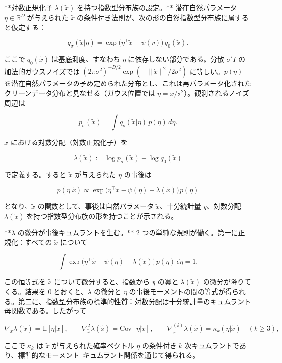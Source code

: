 **対数正規化子 $\lambda(\tilde{x})$ を持つ指数型分布族の設定。** 潜在自然パラメータ $\eta\in\mathbb{R}^D$ が与えられた $\tilde{x}$ の条件付き法則が、次の形の自然指数型分布族に属すると仮定する：

\[
q_\sigma(\tilde{x}|\eta)=\exp\bigl(\eta^\top\tilde{x}-\psi(\eta)\bigr)\,q_0(\tilde{x}).
\]


ここで $q_0(\tilde{x})$ は基底測度、すなわち $\eta$ に依存しない部分である。分散 $\sigma^2 I$ の加法的ガウスノイズでは $(2\pi\sigma^2)^{-D/2}\exp(-\|\tilde{x}\|^2/2\sigma^2)$ に等しい。$p(\eta)$ を潜在自然パラメータの予め定められた分布とし、これは再パラメータ化されたクリーンデータ分布と見なせる（ガウス位置では $\eta=x/\sigma^2$）。観測されるノイズ周辺は

\[
p_\sigma(\tilde{x})=\int q_\sigma(\tilde{x}|\eta)\,p(\eta)\,d\eta.
\]


$\tilde{x}$ における対数分配（対数正規化子）を

\[
\lambda(\tilde{x}):=\log p_\sigma(\tilde{x})-\log q_0(\tilde{x})
\]


で定義する。すると $\tilde{x}$ が与えられた $\eta$ の事後は

\[
p(\eta|\tilde{x})\propto\exp\bigl(\eta^\top\tilde{x}-\psi(\eta)-\lambda(\tilde{x})\bigr)\,p(\eta)
\]


となり、$\tilde{x}$ の関数として、事後は自然パラメータ $\tilde{x}$、十分統計量 $\eta$、対数分配 $\lambda(\tilde{x})$ を持つ指数型分布族の形を持つことが示される。

**$\lambda$ の微分が事後キュムラントを生む。** 2 つの単純な規則が働く。第一に正規化：すべての $\tilde{x}$ について

\[
\int\exp\bigl(\eta^\top\tilde{x}-\psi(\eta)-\lambda(\tilde{x})\bigr)\,p(\eta)\,d\eta=1.
\]


この恒等式を $\tilde{x}$ について微分すると、指数から $\eta$ の冪と $\lambda(\tilde{x})$ の微分が降りてくる。結果を 0 とおくと、$\lambda$ の微分と $\eta$ の事後モーメントの間の等式が得られる。第二に、指数型分布族の標準的性質：対数分配は十分統計量のキュムラント母関数である。したがって

\[
\nabla_{\tilde{x}}\lambda(\tilde{x})=\mathbb{E}[\eta|\tilde{x}],\qquad
\nabla_{\tilde{x}}^2\lambda(\tilde{x})=\mathrm{Cov}[\eta|\tilde{x}],\qquad
\nabla_{\tilde{x}}^{(k)}\lambda(\tilde{x})=\kappa_k(\eta|\tilde{x})\quad(k\ge 3),
\]


ここで $\kappa_k$ は $\tilde{x}$ が与えられた確率ベクトル $\eta$ の条件付き $k$ 次キュムラントであり、標準的なモーメント–キュムラント関係を通じて得られる。

